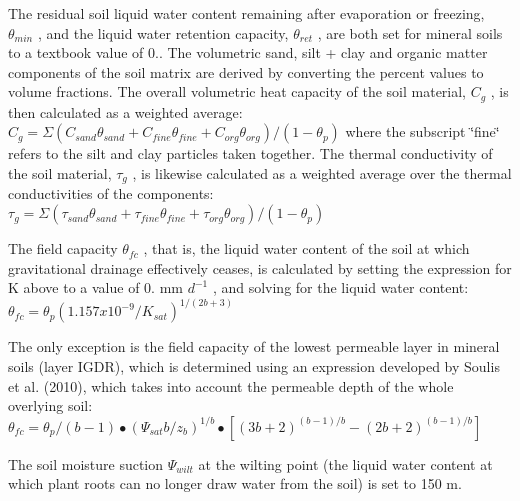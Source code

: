 The residual soil liquid water content remaining after evaporation or freezing, $\theta_{min}$ , and the liquid water retention capacity, $\theta_{ret}$ , are both set for mineral soils to a textbook value of 0.. The volumetric sand, silt + clay and organic matter components of the soil matrix are derived by converting the percent values to volume fractions. The overall volumetric heat capacity of the soil material, $C_g$ , is then calculated as a weighted average\+: $C_g = \Sigma (C_{sand} \theta_{sand} + C_{fine} \theta_{fine} + C_{org} \theta_{org} )/(1 - \theta_p )$ where the subscript \char`\"{}fine\char`\"{} refers to the silt and clay particles taken together. The thermal conductivity of the soil material, $\tau_g$ , is likewise calculated as a weighted average over the thermal conductivities of the components\+: $\tau_g = \Sigma (\tau_{sand} \theta_{sand} + \tau_{fine} \theta_{fine} + \tau_{org} \theta_{org} )/(1 - \theta_p )$

The field capacity $\theta_{fc}$ , that is, the liquid water content of the soil at which gravitational drainage effectively ceases, is calculated by setting the expression for K above to a value of 0. mm $d^{-1}$ , and solving for the liquid water content\+: $\theta_{fc} = \theta_p (1.157 x 10^{-9} /K_{sat} )^{1/(2b + 3)}$

The only exception is the field capacity of the lowest permeable layer in mineral soils (layer I\+G\+D\+R), which is determined using an expression developed by Soulis et al. (2010), which takes into account the permeable depth of the whole overlying soil\+: $\theta_{fc} = \theta_p /(b-1) \bullet (\Psi_{sat} b/ z_b )^{1/b} \bullet [(3b+2)^{(b-1)/b} - (2b+2)^{(b-1)/b} ]$

The soil moisture suction $\Psi_{wilt}$ at the wilting point (the liquid water content at which plant roots can no longer draw water from the soil) is set to 150 m. 